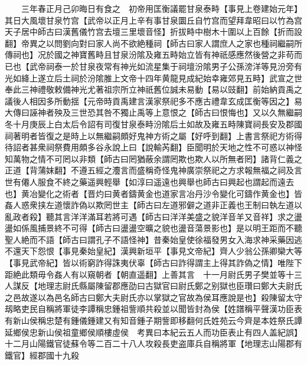 　　三年春正月己卯晦日有食之　初帝用匡衡議罷甘泉泰畤【事見上卷建始元年】其日大風壞甘泉竹宫【武帝以正月上辛有事甘泉圜丘自竹宫而望拜韋昭曰以竹為宫天子居中師古曰漢舊儀竹宫去壇三里壞音怪】折拔畤中樹木十圍以上百餘【折而設翻】帝異之以問劉向對曰家人尚不欲絶種祠【師古曰家人謂庶人之家也種祠繼嗣所傳祠也】况於國之神寶舊畤且甘泉汾隂及雍五畤始立皆有神祇感應然後營之非苟而已也【武帝祠泰一於甘泉夜常有神光如流星集于祠壇汾隂男子公孫滂洋等見汾旁有光如絳上遂立后土祠於汾隂脽上文帝十四年黄龍見成紀始幸雍郊見五畤】武宣之世奉此三神禮敬敕備神光尤著祖宗所立神祇舊位誠未易動【易以豉翻】前始納貢禹之議後人相因多所動揺【元帝時貢禹建言漢家祭祀多不應古禮韋玄成匡衡等因之】易大傳曰誣神者殃及三世恐其咎不獨止禹等上意恨之【師古曰恨悔也】又以久無繼嗣冬十月庚辰上白太后令詔有司復甘泉泰畤汾隂后土如故及雍五畤陳寶祠長安及郡國祠著明者皆復之是時上以無繼嗣頗好鬼神方術之屬【好呼到翻】上書言祭祀方術得待詔者甚衆祠祭費用頗多谷永說上曰【說輸芮翻】臣聞明於天地之性不可惑以神怪知萬物之情不可罔以非類【師古曰罔猶蔽余謂罔欺也欺人以所無者罔】諸背仁義之正道【背蒲妺翻】不遵五經之灋言而盛稱奇怪鬼神廣崇祭祀之方求報無福之祠及言世有僊人服食不終之藥遥興輕舉【如淳曰遥遠也興舉也師古曰興起也謂起而遠去也】黄冶變化之術者【晋灼曰黄者鑄黄金也道家言冶丹沙令變化可鑄作黄金也】皆姦人惑衆挟左道懷詐偽以欺罔世主【師古曰左道邪僻之道非正義也王制曰執左道以亂政者殺】聽其言洋洋滿耳若將可遇【師古曰洋洋美盛之貌洋音羊又音祥】求之盪盪如係風捕景終不可得【師古曰盪盪空曠之貌也盪音蕩景影也】是以明王距而不聽聖人絶而不語【師古曰謂孔子不語怪神】昔秦始皇使徐福發男女入海求神采藥因逃不還天下怨恨【事見秦始皇紀】漢興新垣平【事見文帝紀】齊人少翁公孫卿欒大等【事見武帝紀】皆以術窮詐得誅夷伏辜【師古曰詐得謂主上得其詐偽之情】唯陛下距絶此類毋令姦人有以窺朝者【朝直遥翻】上善其言　十一月尉氏男子樊並等十三人謀反【地理志尉氏縣屬陳留郡應劭曰古獄官曰尉氏鄭之别獄也臣瓚曰鄭大夫尉氏之邑故遂以為邑名師古曰鄭大夫尉氏亦以掌獄之官故為侯耳應說是也】殺陳留太守刼略吏民自稱將軍徒李譚稱忠鍾祖訾順共殺並以聞皆封為侯【姓譜稱平聲漢功臣表有新山侯稱忠楚有鍾儀鍾建又有知音鍾子期訾即移翻何氏姓苑云今齊是本姓祭氏譚延鄉侯忠新山侯祖童鄉侯順樓虛侯　考異曰本紀云五人而功臣表止有四人盖紀誤】　十二月山陽鐵官徒蘇令等二百二十八人攻殺長吏盗庫兵自稱將軍【地理志山陽郡有鐵官】經郡國十九殺